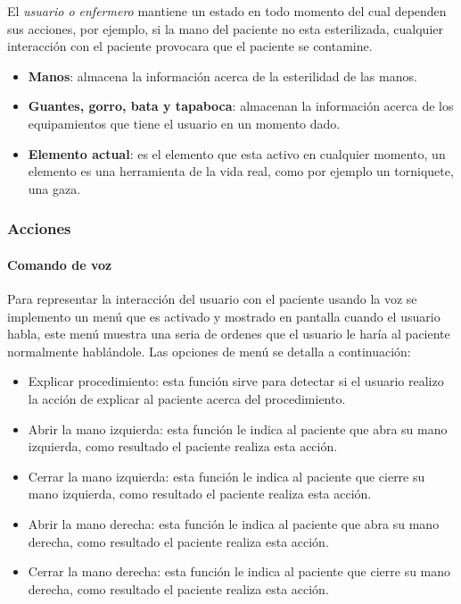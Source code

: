 El \emph{usuario o enfermero} mantiene un estado en todo momento del cual
dependen sus acciones, por ejemplo, si la mano del paciente no esta
esterilizada, cualquier interacción con el paciente provocara que el paciente se
contamine.

\begin{itemize}
    \item \textbf{Manos}: almacena la información acerca de la esterilidad de
        las manos.
    \item \textbf{Guantes, gorro, bata y tapaboca}: almacenan la información
        acerca de los equipamientos que tiene el usuario en un momento dado.
    \item \textbf{Elemento actual}: es el elemento que esta activo en
        cualquier momento, un elemento es una herramienta de la vida real,
        como por ejemplo un torniquete, una gaza.
\end{itemize}

\subsubsection{Acciones}


\paragraph{Comando de voz}

Para representar la interacción del usuario con el paciente usando la voz se
implemento un menú que es activado y mostrado en pantalla cuando el usuario
habla, este menú muestra una seria de ordenes que el usuario le haría al
paciente normalmente hablándole. Las opciones de menú se detalla a continuación:

\begin{itemize}
\item Explicar procedimiento: esta función sirve para detectar si el usuario
    realizo la acción de explicar al paciente acerca del procedimiento. 
\item Abrir la mano izquierda: esta función le indica al paciente que abra su
    mano izquierda, como resultado el paciente realiza esta acción.
\item Cerrar la mano izquierda: esta función le indica al paciente que cierre su
    mano izquierda, como resultado el paciente realiza esta acción.
\item Abrir la mano derecha: esta función le indica al paciente que abra su mano
    derecha, como resultado el paciente realiza esta acción.
\item Cerrar la mano derecha: esta función le indica al paciente que cierre su
    mano derecha, como resultado el paciente realiza esta acción.
\end{itemize}

